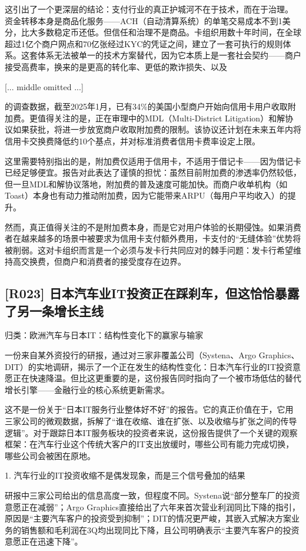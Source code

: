\documentclass[11pt]{ctexart}
\begin{document}
这引出了一个更深层的结论：支付行业的真正护城河不在于技术，而在于治理。 资金转移本身是商品化服务——ACH（自动清算系统）的单笔交易成本不到1美分，比大多数稳定币还低。但信任和治理不是商品。卡组织用数十年时间，在全球超过1亿个商户网点和70亿张经过KYC的凭证之间，建立了一套可执行的规则体系。这套体系无法被单一的技术方案替代，因为它本质上是一套社会契约——商户接受高费率，换来的是更高的转化率、更低的欺诈损失、以及

[... middle omitted ...]

的调查数据，截至2025年1月，已有34\%的美国小型商户开始向信用卡用户收取附加费。更值得关注的是，正在审理中的MDL（Multi-District Litigation）和解协议如果获批，将进一步放宽商户收取附加费的限制。该协议还计划在未来五年内将信用卡交换费降低约10个基点，并对标准消费者信用卡费率设定上限。

这里需要特别指出的是，附加费仅适用于信用卡，不适用于借记卡——因为借记卡已经足够便宜。报告对此表达了谨慎的担忧：虽然目前附加费的渗透率仍然较低，但一旦MDL和解协议落地，附加费的普及速度可能加快。而商户收单机构（如Toast）本身也有动力推动附加费，因为它能带来ARPU（每用户平均收入）的提升。

然而，真正值得关注的不是附加费本身，而是它对用户体验的长期侵蚀。如果消费者在越来越多的场景中被要求为信用卡支付额外费用，卡支付的“无缝体验”优势将被削弱。这对卡组织而言是一个必须与发卡行共同应对的棘手问题：发卡行希望维持高交换费，但商户和消费者的接受度存在边界。

\subsection{[R023] 日本汽车业IT投资正在踩刹车，但这恰恰暴露了另一条增长主线}
{\small\color{refgray}归类：欧洲汽车与日本IT：结构性变化下的赢家与输家}

一份来自某外资投行的研报，通过对三家非覆盖公司（Systena、Argo Graphics、DIT）的实地调研，揭示了一个正在发生的结构性变化：日本汽车行业的IT投资意愿正在快速降温。但比这更重要的是，这份报告同时指向了一个被市场低估的替代增长引擎——金融行业的核心系统更新需求。

这不是一份关于“日本IT服务行业整体好不好”的报告。它的真正价值在于，它用三家公司的微观数据，拆解了“谁在收缩、谁在扩张、以及收缩与扩张之间的传导逻辑”。对于跟踪日本IT服务板块的投资者来说，这份报告提供了一个关键的观察框架：在汽车行业这个传统大客户的IT支出放缓时，哪些公司有能力完成切换，哪些公司会被困在原地。

1. 汽车行业的IT投资收缩不是偶发现象，而是三个信号叠加的结果

研报中三家公司给出的信息高度一致，但程度不同。Systena说“部分整车厂的投资意愿正在减弱”；Argo Graphics直接给出了六年来首次营业利润同比下降的指引，原因是“主要汽车客户的投资受到抑制”；DIT的情况更严峻，其嵌入式解决方案业务的销售额和毛利润在3Q均出现同比下降，且公司明确表示“主要汽车客户的投资意愿正在迅速下降”。
\end{document}
